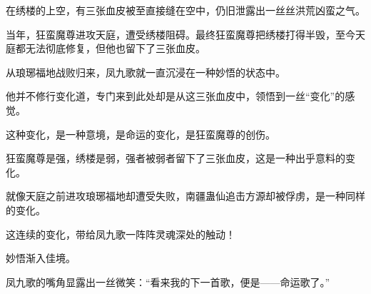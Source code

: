 \begin{this_body}
在绣楼的上空，有三张血皮被至直接缝在空中，仍旧泄露出一丝丝洪荒凶蛮之气。

当年，狂蛮魔尊进攻天庭，遭受绣楼阻碍。最终狂蛮魔尊把绣楼打得半毁，至今天庭都无法彻底修复，但他也留下了三张血皮。

从琅琊福地战败归来，凤九歌就一直沉浸在一种妙悟的状态中。

他并不修行变化道，专门来到此处却是从这三张血皮中，领悟到一丝“变化”的感觉。

这种变化，是一种意境，是命运的变化，是狂蛮魔尊的创伤。

狂蛮魔尊是强，绣楼是弱，强者被弱者留下了三张血皮，这是一种出乎意料的变化。

就像天庭之前进攻琅琊福地却遭受失败，南疆蛊仙追击方源却被俘虏，是一种同样的变化。

这连续的变化，带给凤九歌一阵阵灵魂深处的触动！

妙悟渐入佳境。

凤九歌的嘴角显露出一丝微笑：“看来我的下一首歌，便是——命运歌了。”

\end{this_body}

